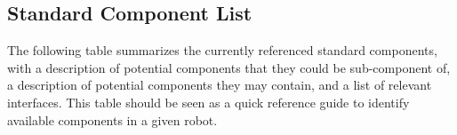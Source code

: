 \subsection{Standard Component List}
\label{sec:naming:components}

The following table summarizes the currently referenced standard
components, with a description of potential components that they could
be sub-component of, a description of potential components they may
contain, and a list of relevant interfaces. This table should be seen as a
quick reference guide to identify available components in a given
robot.

\newcommand{\component}[5]
{
  \lstindex{#1} &
  #5 &
  \code{#2} &
  \code{#3} &
  \code{#4}\\
  \hline
}

\tablelasttail{%
  \hline
}
